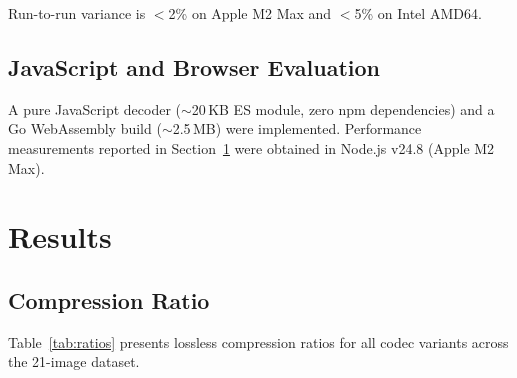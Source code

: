 \documentclass[journal]{IEEEtran}
\begin{document}
Run-to-run variance is $<$2\% on Apple M2 Max and $<$5\% on Intel AMD64.

\subsection{JavaScript and Browser Evaluation}

A pure JavaScript decoder (${\sim}$20\,KB ES module, zero npm dependencies) and
a Go WebAssembly build (${\sim}$2.5\,MB) were implemented. Performance
measurements reported in Section~\ref{sec:results} were obtained in Node.js
v24.8 (Apple M2 Max).

\section{Results}
\label{sec:results}

\subsection{Compression Ratio}

Table~\ref{tab:ratios} presents lossless compression ratios for all codec
variants across the 21-image dataset.
\end{document}
